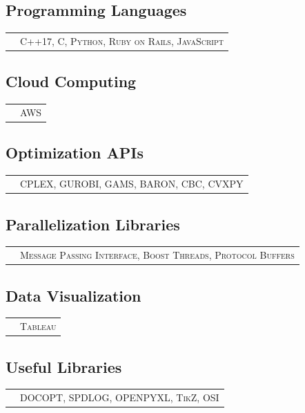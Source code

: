 \documentclass[10PT,letter]{article}
\newcommand{\subsectionstyle}[1]{\normalfont\selectfont\textcolor{titlecol}{\sffamily #1}}
\begin{document}
        	\subsection*{\subsectionstyle{Programming Languages}}
		            \begin{tabular}{p{0.2in}p{5.55in}}
		                & \textsc{C++17, C, Python, Ruby on Rails, JavaScript}
		            \end{tabular}
        
        \subsection*{\subsectionstyle{Cloud Computing}}
		        \begin{tabular}{p{.2in}p{5.55in}}
		        	 & \textsc{AWS}
		        \end{tabular}
    
   	  	\subsection*{\subsectionstyle{Optimization  APIs}}
			    \begin{tabular}{p{.2in}p{5.55in}}
			     	& 	\textsc{CPLEX, GUROBI, GAMS, BARON, CBC, CVXPY}
			    \end{tabular}
		 \subsection*{\subsectionstyle{Parallelization Libraries }}
				\begin{tabular}{p{.2in}p{5.55in}}
				 	& 	\textsc{Message Passing Interface, Boost Threads, Protocol Buffers}
				\end{tabular}

     	\subsection*{\subsectionstyle{Data Visualization}}
				\begin{tabular}{p{.2in}p{5.55in}}
					& \textsc{Tableau} 
				\end{tabular}
     	\subsection*{\subsectionstyle{Useful Libraries}}
				\begin{tabular}{p{.2in}p{5.55in}}
					& \textsc{DOCOPT,  SPDLOG, OPENPYXL, TikZ, OSI} 
				\end{tabular}
\end{document}
